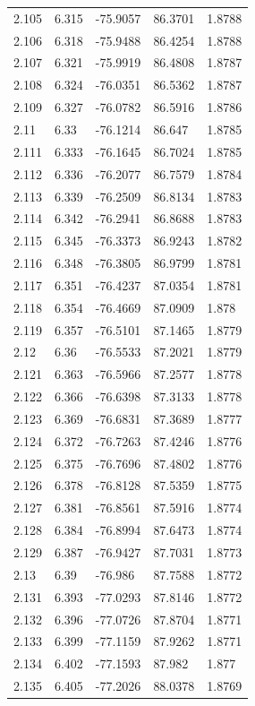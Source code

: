 \begin{tabular}{lllll}
2.105 & 6.315 & -75.9057 & 86.3701 & 1.8788 \\
2.106 & 6.318 & -75.9488 & 86.4254 & 1.8788 \\
2.107 & 6.321 & -75.9919 & 86.4808 & 1.8787 \\
2.108 & 6.324 & -76.0351 & 86.5362 & 1.8787 \\
2.109 & 6.327 & -76.0782 & 86.5916 & 1.8786 \\
2.11 & 6.33 & -76.1214 & 86.647 & 1.8785 \\
2.111 & 6.333 & -76.1645 & 86.7024 & 1.8785 \\
2.112 & 6.336 & -76.2077 & 86.7579 & 1.8784 \\
2.113 & 6.339 & -76.2509 & 86.8134 & 1.8783 \\
2.114 & 6.342 & -76.2941 & 86.8688 & 1.8783 \\
2.115 & 6.345 & -76.3373 & 86.9243 & 1.8782 \\
2.116 & 6.348 & -76.3805 & 86.9799 & 1.8781 \\
2.117 & 6.351 & -76.4237 & 87.0354 & 1.8781 \\
2.118 & 6.354 & -76.4669 & 87.0909 & 1.878 \\
2.119 & 6.357 & -76.5101 & 87.1465 & 1.8779 \\
2.12 & 6.36 & -76.5533 & 87.2021 & 1.8779 \\
2.121 & 6.363 & -76.5966 & 87.2577 & 1.8778 \\
2.122 & 6.366 & -76.6398 & 87.3133 & 1.8778 \\
2.123 & 6.369 & -76.6831 & 87.3689 & 1.8777 \\
2.124 & 6.372 & -76.7263 & 87.4246 & 1.8776 \\
2.125 & 6.375 & -76.7696 & 87.4802 & 1.8776 \\
2.126 & 6.378 & -76.8128 & 87.5359 & 1.8775 \\
2.127 & 6.381 & -76.8561 & 87.5916 & 1.8774 \\
2.128 & 6.384 & -76.8994 & 87.6473 & 1.8774 \\
2.129 & 6.387 & -76.9427 & 87.7031 & 1.8773 \\
2.13 & 6.39 & -76.986 & 87.7588 & 1.8772 \\
2.131 & 6.393 & -77.0293 & 87.8146 & 1.8772 \\
2.132 & 6.396 & -77.0726 & 87.8704 & 1.8771 \\
2.133 & 6.399 & -77.1159 & 87.9262 & 1.8771 \\
2.134 & 6.402 & -77.1593 & 87.982 & 1.877 \\
2.135 & 6.405 & -77.2026 & 88.0378 & 1.8769 \\

\end{tabular}
